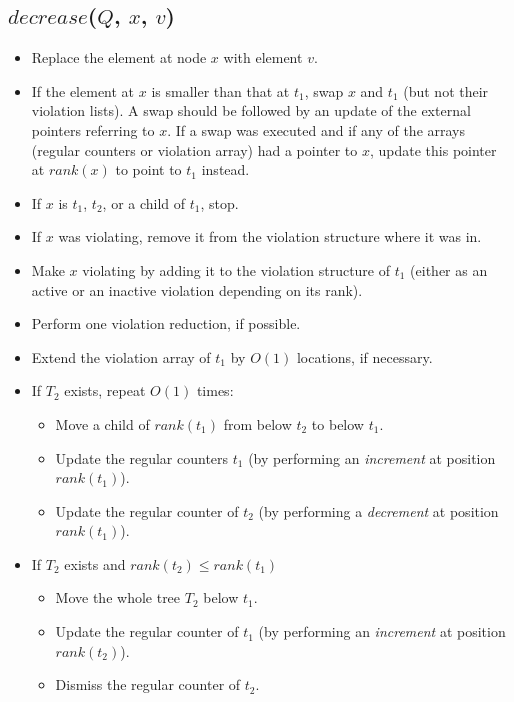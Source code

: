 \documentclass{llncs}
\newcommand{\Decrease}{\mbox{$\mathit{decrease}$}}
\begin{document}
\subsection*{\Decrease{}($Q$, $x$, $v$)}

\begin{itemize}
\item Replace the element at node $x$ with element $v$.
\item If the element at $x$ is smaller than that at $t_1$,
 swap $x$ and $t_1$ (but not their violation lists).
A swap should be followed by an update of the external
pointers referring to $x$. If a swap was executed and
 if any of the arrays (regular counters or violation array) had a pointer
  to $x$, update this pointer at $\mathit{rank}(x)$ to point to $t_1$
  instead. 
\item If $x$ is $t_1$, $t_2$, or a child of $t_1$,
 stop.
\item If $x$ was violating,
 remove it from the violation structure where it was in.
\item Make $x$ violating by adding it to the violation structure of
  $t_1$ (either as an active or an inactive violation depending on
  its rank).
\item Perform one violation reduction, if possible.
\item Extend the violation array of $t_1$ by $O(1)$ locations, if necessary.
\item If $T_2$ exists, repeat $O(1)$ times: 
   \begin{itemize}
    \item Move a child of $\mathit{rank}(t_1)$ from below $t_2$ to below $t_1$.
    \item  Update the regular counters $t_1$ (by performing an {\it increment} at position $\mathit{rank}(t_1)$).
    \item  Update the regular counter of $t_2$ (by performing a {\it decrement} at position $\mathit{rank}(t_1)$).
   \end{itemize}
\item If $T_2$ exists and $\mathit{rank}(t_2) \leq \mathit{rank}(t_1)$
	\begin{itemize} 
		\item  Move the whole tree $T_2$ below $t_1$.
	  \item  Update the regular counter of $t_1$ (by performing an {\it increment} at position $rank(t_2)$).
	  \item  Dismiss the regular counter of $t_2$.
  \end{itemize}  
\end{itemize}
\end{document}
